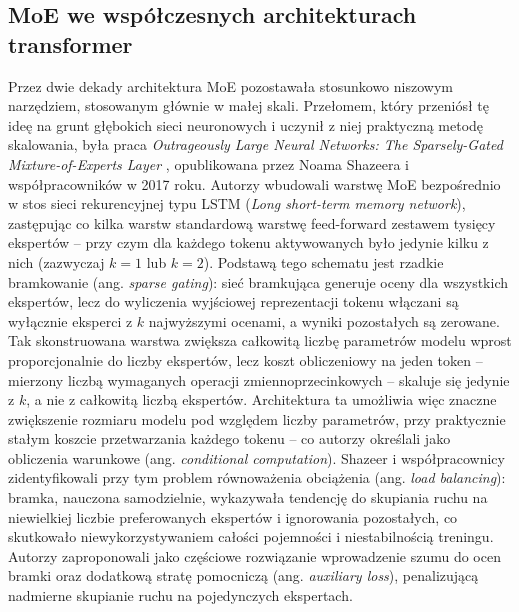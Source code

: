 \subsection{MoE we współczesnych architekturach transformer}
\label{sec:moe_transformer}
Przez dwie dekady architektura MoE pozostawała stosunkowo niszowym narzędziem, stosowanym głównie w małej skali. Przełomem, który przeniósł tę ideę na grunt głębokich sieci neuronowych i uczynił z niej praktyczną metodę skalowania, była praca \textit{Outrageously Large Neural Networks: The Sparsely-Gated Mixture-of-Experts Layer} \cite{shazeer_2017_sparsely_gated_mixture_of_experts}, opublikowana przez Noama Shazeera i współpracowników w 2017 roku. Autorzy wbudowali warstwę MoE bezpośrednio w stos sieci rekurencyjnej typu LSTM (\textit{Long short-term memory network}), zastępując co kilka warstw standardową warstwę feed-forward zestawem tysięcy ekspertów -- przy czym dla każdego tokenu aktywowanych było jedynie kilku z nich (zazwyczaj $k = 1$ lub $k = 2$). \newline
Podstawą tego schematu jest rzadkie bramkowanie (ang. \textit{sparse gating}): sieć bramkująca generuje oceny dla wszystkich ekspertów, lecz do wyliczenia wyjściowej reprezentacji tokenu włączani są wyłącznie eksperci z $k$ najwyższymi ocenami, a wyniki pozostałych są zerowane. Tak skonstruowana warstwa zwiększa całkowitą liczbę parametrów modelu wprost proporcjonalnie do liczby ekspertów, lecz koszt obliczeniowy na jeden token -- mierzony liczbą wymaganych operacji zmiennoprzecinkowych -- skaluje się jedynie z $k$, a nie z całkowitą liczbą ekspertów. Architektura ta umożliwia więc znaczne zwiększenie rozmiaru modelu pod względem liczby parametrów, przy praktycznie stałym koszcie przetwarzania każdego tokenu -- co autorzy określali jako obliczenia warunkowe (ang. \textit{conditional computation}). Shazeer i współpracownicy zidentyfikowali przy tym problem równoważenia obciążenia (ang. \textit{load balancing}): bramka, nauczona samodzielnie, wykazywała tendencję do skupiania ruchu na niewielkiej liczbie preferowanych ekspertów i ignorowania pozostałych, co skutkowało niewykorzystywaniem całości pojemności i niestabilnością treningu. Autorzy zaproponowali jako częściowe rozwiązanie wprowadzenie szumu do ocen bramki oraz dodatkową stratę pomocniczą (ang. \textit{auxiliary loss}), penalizującą nadmierne skupianie ruchu na pojedynczych ekspertach.
